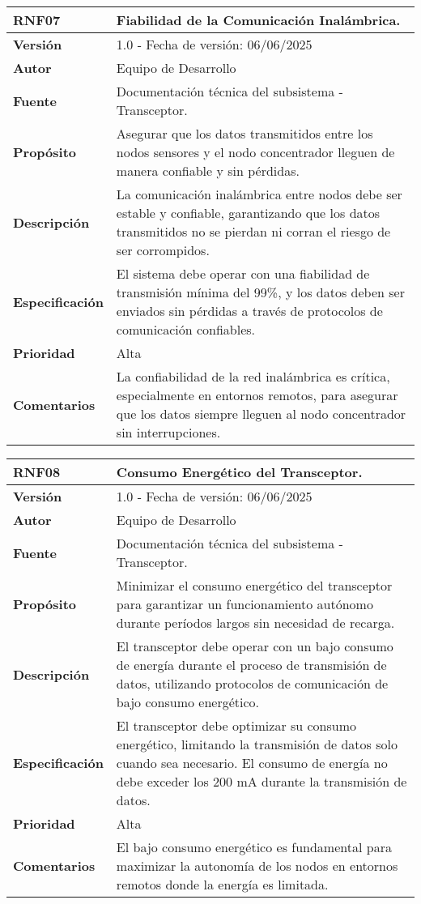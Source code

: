 \begin{longtable}{|l|p{12cm}|}
\hline
\textbf{RNF07} & \textbf{Fiabilidad de la Comunicación Inalámbrica.} \\
\hline
\endfirsthead
\hline
\textbf{Versión} & 1.0 - Fecha de versión: 06/06/2025 \\
\hline
\textbf{Autor} & Equipo de Desarrollo \\
\hline
\textbf{Fuente} & Documentación técnica del subsistema - Transceptor. \\
\hline
\textbf{Propósito} & Asegurar que los datos transmitidos entre los nodos sensores y el nodo concentrador lleguen de manera confiable y sin pérdidas. \\
\hline
\textbf{Descripción} & La comunicación inalámbrica entre nodos debe ser estable y confiable, garantizando que los datos transmitidos no se pierdan ni corran el riesgo de ser corrompidos. \\
\hline
\textbf{Especificación} & El sistema debe operar con una fiabilidad de transmisión mínima del 99\%, y los datos deben ser enviados sin pérdidas a través de protocolos de comunicación confiables. \\
\hline
\textbf{Prioridad} & Alta \\
\hline
\textbf{Comentarios} & La confiabilidad de la red inalámbrica es crítica, especialmente en entornos remotos, para asegurar que los datos siempre lleguen al nodo concentrador sin interrupciones. \\
\hline
\end{longtable}

\begin{longtable}{|l|p{12cm}|}
\hline
\textbf{RNF08} & \textbf{Consumo Energético del Transceptor.} \\
\hline
\endfirsthead
\hline
\textbf{Versión} & 1.0 - Fecha de versión: 06/06/2025 \\
\hline
\textbf{Autor} & Equipo de Desarrollo \\
\hline
\textbf{Fuente} & Documentación técnica del subsistema - Transceptor. \\
\hline
\textbf{Propósito} & Minimizar el consumo energético del transceptor para garantizar un funcionamiento autónomo durante períodos largos sin necesidad de recarga. \\
\hline
\textbf{Descripción} & El transceptor debe operar con un bajo consumo de energía durante el proceso de transmisión de datos, utilizando protocolos de comunicación de bajo consumo energético. \\
\hline
\textbf{Especificación} & El transceptor debe optimizar su consumo energético, limitando la transmisión de datos solo cuando sea necesario. El consumo de energía no debe exceder los 200 mA durante la transmisión de datos. \\
\hline
\textbf{Prioridad} & Alta \\
\hline
\textbf{Comentarios} & El bajo consumo energético es fundamental para maximizar la autonomía de los nodos en entornos remotos donde la energía es limitada. \\
\hline
\end{longtable}

